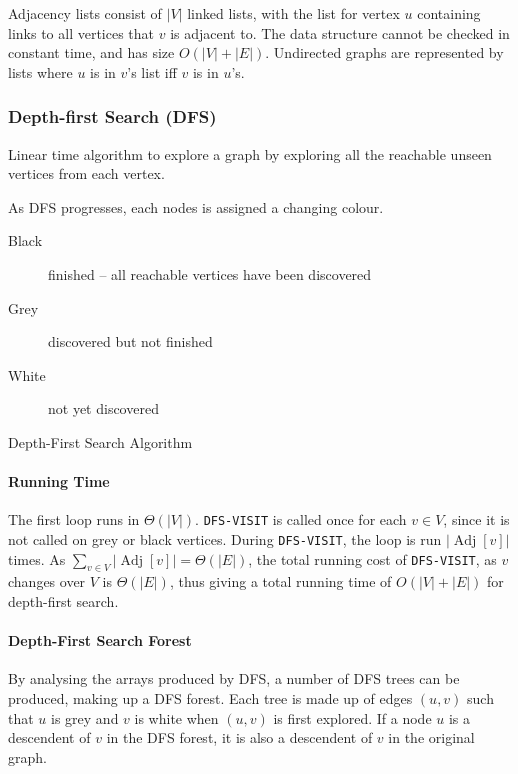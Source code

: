 \documentclass[10pt]{article}
\begin{document}
Adjacency lists consist of $|V|$ linked lists, with the list for vertex $u$ containing links to all vertices that $v$ is adjacent to.  The data structure cannot be checked in constant time, and has size $O(|V|+|E|)$.  Undirected graphs are represented by lists where $u$ is in $v$'s list iff $v$ is in $u$'s.
\subsubsection{Depth-first Search (DFS)}
Linear time algorithm to explore a graph by exploring all the reachable unseen vertices from each vertex.

As DFS progresses, each nodes is assigned a changing colour.
\begin{description}
	\item[Black]finished -- all reachable vertices have been discovered
	\item[Grey] discovered but not finished
	\item[White] not yet discovered
\end{description}
\begin{algorithm}
	\caption{Depth-First Search Algorithm}
\end{algorithm}
\paragraph{Running Time} The first loop runs in $\Theta(|V|)$.  \texttt{DFS-VISIT} is called once for each $v\in V$, since it is not called on grey or black vertices.  During \texttt{DFS-VISIT}, the loop is run $|\mathop{Adj}[v]|$ times.  As $\sum_{v\in V}|\mathop{Adj}[v]|=\Theta(|E|)$, the total running cost of \texttt{DFS-VISIT}, as $v$ changes over $V$ is $\Theta(|E|)$, thus giving a total running time of $O(|V|+|E|)$ for depth-first search.
\paragraph{Depth-First Search Forest}
By analysing the arrays produced by DFS, a number of DFS trees can be produced, making up a DFS forest.  Each tree is made up of edges $(u,v)$ such that $u$ is grey and $v$ is white when $(u,v)$ is first explored. If a node $u$ is a descendent of $v$ in the DFS forest, it is also a descendent of $v$ in the original graph.
\end{document}
